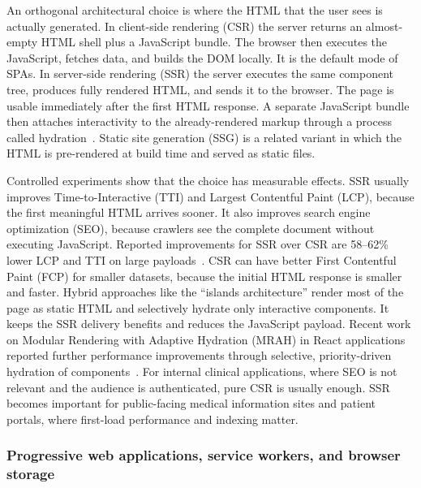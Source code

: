 An orthogonal architectural choice is where the HTML that the user sees is actually generated. In client-side rendering (CSR) the server returns an almost-empty HTML shell plus a JavaScript bundle. The browser then executes the JavaScript, fetches data, and builds the DOM locally. It is the default mode of SPAs. In server-side rendering (SSR) the server executes the same component tree, produces fully rendered HTML, and sends it to the browser. The page is usable immediately after the first HTML response. A separate JavaScript bundle then attaches interactivity to the already-rendered markup through a process called hydration~\cite{clapton2025csr_ssr, iskandar2020csr_ssr}. Static site generation (SSG) is a related variant in which the HTML is pre-rendered at build time and served as static files.

Controlled experiments show that the choice has measurable effects. SSR usually improves Time-to-Interactive (TTI) and Largest Contentful Paint (LCP), because the first meaningful HTML arrives sooner. It also improves search engine optimization (SEO), because crawlers see the complete document without executing JavaScript. Reported improvements for SSR over CSR are 58--62\% lower LCP and TTI on large payloads~\cite{clapton2025csr_ssr}. CSR can have better First Contentful Paint (FCP) for smaller datasets, because the initial HTML response is smaller and faster. Hybrid approaches like the ``islands architecture'' render most of the page as static HTML and selectively hydrate only interactive components. It keeps the SSR delivery benefits and reduces the JavaScript payload. Recent work on Modular Rendering with Adaptive Hydration (MRAH) in React applications reported further performance improvements through selective, priority-driven hydration of components~\cite{chen2025mrah}. For internal clinical applications, where SEO is not relevant and the audience is authenticated, pure CSR is usually enough. SSR becomes important for public-facing medical information sites and patient portals, where first-load performance and indexing matter.

\subsubsection{Progressive web applications, service workers, and browser storage}
\label{subsec:pwa_browser_storage}

